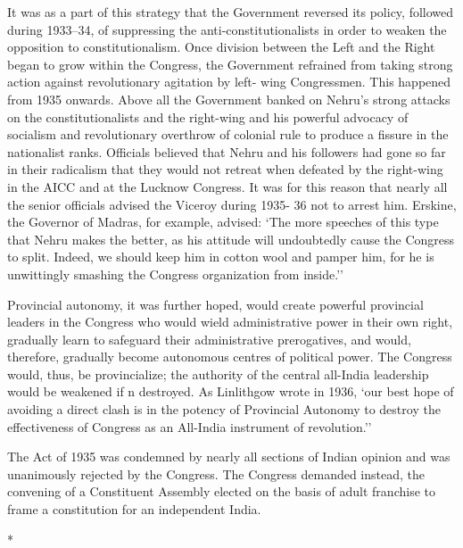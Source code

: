 \begin{multicols}{2}
It was as a part of this strategy that the Government reversed its policy, followed during 1933--34, of suppressing the anti-constitutionalists in order to weaken the opposition to constitutionalism. Once division between the Left and the Right began to grow within the Congress, the Government refrained from taking strong action against revolutionary agitation by left- wing Congressmen. This happened from 1935 onwards. Above all the Government banked on Nehru's strong attacks on the constitutionalists and the right-wing and his powerful advocacy of socialism and revolutionary overthrow of colonial rule to produce a fissure in the nationalist ranks. Officials believed that Nehru and his followers had gone so far in their radicalism that they would not retreat when defeated by the right-wing in the AICC and at the Lucknow Congress. It was for this reason that nearly all the senior officials advised the Viceroy during 1935- 36 not to arrest him. Erskine, the Governor of Madras, for example, advised: `The more speeches of this type that Nehru makes the better, as his attitude will undoubtedly cause the Congress to split. Indeed, we should keep him in cotton wool and pamper him, for he is unwittingly smashing the Congress organization from inside.'' 

Provincial autonomy, it was further hoped, would create powerful provincial leaders in the Congress who would wield administrative power in their own right, gradually learn to safeguard their administrative prerogatives, and would, therefore, gradually become autonomous centres of political power. The Congress would, thus, be provincialize; the authority of the central all-India leadership would be weakened if n destroyed. As Linlithgow wrote in 1936, `our best hope of avoiding a direct clash is in the potency of Provincial Autonomy to destroy the effectiveness of Congress as an All-India instrument of revolution.'' 

The Act of 1935 was condemned by nearly all sections of Indian opinion and was unanimously rejected by the Congress. The Congress demanded instead, the convening of a Constituent Assembly elected on the basis of adult franchise to frame a constitution for an independent India.

\begin{center}*\end{center}

\paragraph*{}


\end{multicols}
